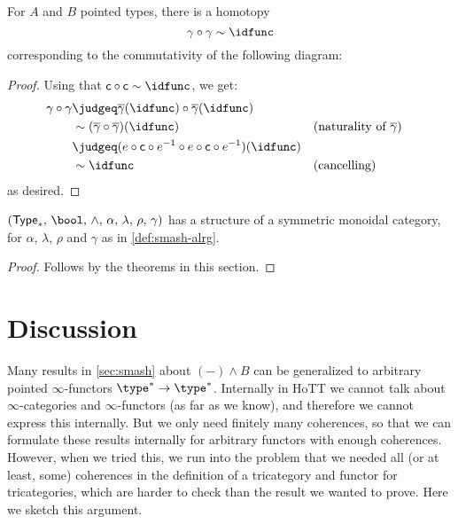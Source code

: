 \documentclass{article}
\newcommand{\smsh}{\wedge}
\renewcommand{\o}{\ensuremath{\circ}}
\newcommand{\sy}{^{-1}}
\newcommand{\gammabar}{\overline{\gamma}}
\newcommand{\pType}{\mathsf{Type}_\ast}
\newcommand{\twist}{\mathsf{c}}
\begin{document}
\begin{thm}\label{thm:smash-double-braiding}
	For $A$ and $B$ pointed types, there is a homotopy
	\[\gamma \o \gamma \sim \idfunc\]
	corresponding to the commutativity of the following diagram:
	\begin{center}
	\end{center}
\end{thm}
\begin{proof}
	Using that $\twist \o \twist \sim \idfunc$, we get:
	\begin{align*}
		\gamma \o \gamma
		&\judgeq \gammabar(\idfunc) \o \gammabar(\idfunc)\\
		&\sim (\gammabar \o \gammabar)(\idfunc) &&\text{(naturality of $\gammabar$)}\\
		&\judgeq (e \o \twist \o e\sy \o e \o \twist \o e\sy)(\idfunc)\\
		&\sim \idfunc &&\text{(cancelling)}
	\end{align*}
	as desired.
\end{proof}

\begin{cor}
	$(\pType,\, \bool,\, \smsh,\, \alpha,\, \lambda,\, \rho,\, \gamma)$ has a structure of a symmetric monoidal category, for $\alpha$, $\lambda$, $\rho$ and $\gamma$ as in \autoref{def:smash-alrg}.
\end{cor}
\begin{proof}
	Follows by the theorems in this section.
\end{proof}

\section{Discussion}

Many results in \autoref{sec:smash} about $({-}) \smsh B$ can be generalized to arbitrary pointed $\infty$-functors $\type^*\to\type^*$. Internally in HoTT we cannot talk about $\infty$-categories and $\infty$-functors (as far as we know), and therefore we cannot express this internally. But we only need finitely many coherences, so that we can formulate these results internally for arbitrary functors with enough coherences. However, when we tried this, we run into the problem that we needed all (or at least, some) coherences in the definition of a tricategory and functor for tricategories, which are harder to check than the result we wanted to prove. Here we sketch this argument.
\end{document}
